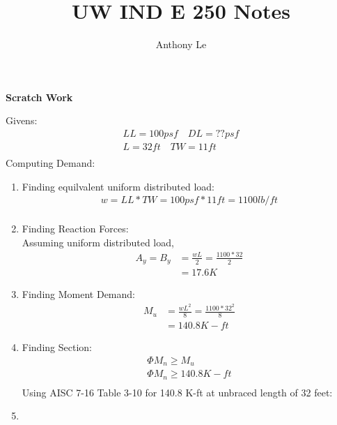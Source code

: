 \documentclass{report} %
\title{UW IND E 250 Notes}
\author{Anthony Le}
\begin{document}
\pagestyle{fancy}
\fancyhead{}

\begin{center}
    \LARGE{\textbf{Scratch Work}}
\end{center}

Givens:
\begin{equation*}
    \begin{aligned}
        LL = 100 psf \quad DL = ?? psf\\
        L = 32 ft \quad TW = 11 ft \\
    \end{aligned}
\end{equation*}
Computing Demand:
\begin{enumerate}
    \item Finding equilvalent uniform distributed load:
    \begin{equation*}
        \begin{aligned}
            w = LL * TW = 100psf * 11ft = 1100lb/ft \\
        \end{aligned}
    \end{equation*}
    \item Finding Reaction Forces: \\
    Assuming uniform distributed load,
    \begin{equation*}
        \begin{aligned}
            A_y = B_y &= \frac{wL}{2} = \frac{1100*32}{2} \\
                      &= 17.6K 
        \end{aligned}
    \end{equation*}
    \item Finding Moment Demand:
    \begin{equation*}
        \begin{aligned}
            M_u &= \frac{wL^2}{8} = \frac{1100*32^2}{8} \\
                &= 140.8K-ft
        \end{aligned}
    \end{equation*} 
    \item Finding Section:
    \begin{equation*}
        \begin{aligned}
            \Phi M_n \geq M_u \\
            \Phi M_n \geq 140.8K-ft \\
        \end{aligned}
    \end{equation*}
    Using AISC 7-16 Table 3-10 for 140.8 K-ft at unbraced length of 32 feet:
    \item 

\end{enumerate}
\end{document}
